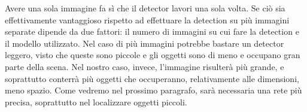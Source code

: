 Avere una sola immagine fa sì che il detector lavori una sola volta. Se ciò sia effettivamente vantaggioso rispetto ad effettuare la detection su più immagini separate dipende da due fattori: il numero di immagini su cui fare la detection e il modello utilizzato. Nel caso di più immagini potrebbe bastare un detector leggero, visto che queste sono piccole e gli oggetti sono di meno e occupano gran parte della scena. Nel nostro caso, invece, l'immagine risulterà più grande, e soprattutto conterrà più oggetti che occuperanno, relativamente alle dimensioni, meno spazio. Come vedremo nel prossimo paragrafo, sarà necessaria una rete più precisa, soprattutto nel localizzare oggetti piccoli.